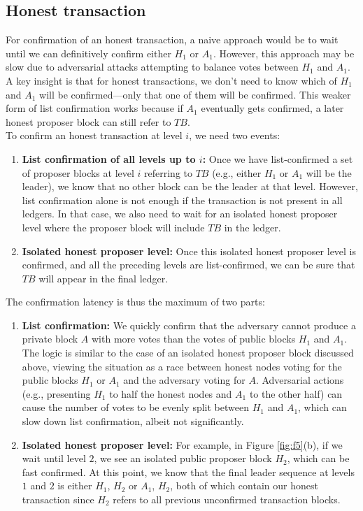 \subsection{Honest transaction}
For confirmation of an honest transaction, a naive approach would be to wait until we can definitively confirm either $H_{1}$ or $A_{1}$. However, this approach may be slow due to adversarial attacks attempting to balance votes between $H_{1}$ and $A_{1}$. A key insight is that for honest transactions, we don't need to know which of $H_{1}$ and $A_{1}$ will be confirmed—only that one of them will be confirmed. This weaker form of list confirmation works because if $A_{1}$ eventually gets confirmed, a later honest proposer block can still refer to $TB$.\\
To confirm an honest transaction at level $i$, we need two events:
\begin{enumerate}
    \item \textbf{List confirmation of all levels up to $i$:} Once we have list-confirmed a set of proposer blocks at level $i$ referring to $TB$ (e.g., either $H_{1}$ or $A_{1}$ will be the leader), we know that no other block can be the leader at that level. However, list confirmation alone is not enough if the transaction is not present in all ledgers. In that case, we also need to wait for an isolated honest proposer level where the proposer block will include $TB$ in the ledger.
    \item \textbf{Isolated honest proposer level:} Once this isolated honest proposer level is confirmed, and all the preceding levels are list-confirmed, we can be sure that $TB$ will appear in the final ledger.
\end{enumerate}
The confirmation latency is thus the maximum of two parts:\\
\begin{enumerate}
    \item \textbf{List confirmation:} We quickly confirm that the adversary cannot produce a private block $A$ with more votes than the votes of public blocks $H_{1}$ and $A_{1}$. The logic is similar to the case of an isolated honest proposer block discussed above, viewing the situation as a race between honest nodes voting for the public blocks $H_{1}$ or $A_{1}$ and the adversary voting for $A$. Adversarial actions (e.g., presenting $H_{1}$ to half the honest nodes and $A_{1}$ to the other half) can cause the number of votes to be evenly split between $H_{1}$ and $A_{1}$, which can slow down list confirmation, albeit not significantly.
    \item \textbf{Isolated honest proposer level:} For example, in Figure \ref{fig:f5}(b), if we wait until level $2$, we see an isolated public proposer block $H_{2}$, which can be fast confirmed. At this point, we know that the final leader sequence at levels $1$ and $2$ is either $H_{1}$, $H_{2}$ or $A_{1}$, $H_{2}$, both of which contain our honest transaction since $H_{2}$ refers to all previous unconfirmed transaction blocks.
\end{enumerate}
